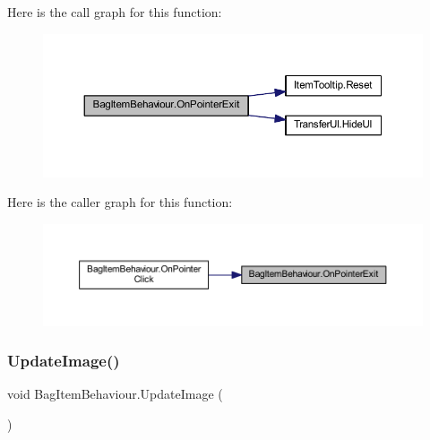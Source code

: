 Here is the call graph for this function\+:
\nopagebreak
\begin{figure}[H]
\begin{center}
\leavevmode
\includegraphics[width=350pt]{class_bag_item_behaviour_a94a401c7a518b7ed17e5648153d6f1b6_cgraph}
\end{center}
\end{figure}
Here is the caller graph for this function\+:
\nopagebreak
\begin{figure}[H]
\begin{center}
\leavevmode
\includegraphics[width=350pt]{class_bag_item_behaviour_a94a401c7a518b7ed17e5648153d6f1b6_icgraph}
\end{center}
\end{figure}
\mbox{\label{class_bag_item_behaviour_aaedcc49f5d2def63dcde17d72fdb3b9d}} 
\subsubsection{\texorpdfstring{UpdateImage()}{UpdateImage()}}
{\footnotesize\ttfamily void Bag\+Item\+Behaviour.\+Update\+Image (\begin{DoxyParamCaption}{ }\end{DoxyParamCaption})}

